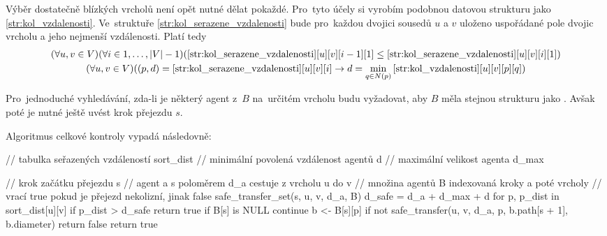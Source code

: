 Výběr dostatečně blízkých vrcholů není opět nutné dělat pokaždé.
Pro~tyto účely si vyrobím podobnou datovou strukturu jako \ref{str:kol_vzdalenosti}.
Ve~struktuře \ref{str:kol_serazene_vzdalenosti}
bude pro~každou dvojici sousedů $u$ a $v$ uloženo uspořádané pole dvojic vrcholu a jeho nejmenší vzdálenosti.
Platí tedy
\begin{gather*}
(\forall u, v \in V)(\forall i \in {1, \dots, |V| - 1})(\ref{str:kol_serazene_vzdalenosti}[u][v][i - 1][1] \leq
\ref{str:kol_serazene_vzdalenosti}[u][v][i][1])
	\\
	(\forall u, v \in V)((p, d) = \ref{str:kol_serazene_vzdalenosti}[u][v][i] \rightarrow
	d = \min_{q \in N(p)}\ref{str:kol_vzdalenosti}[u][v][p][q])
\end{gather*}

Pro~jednoduché vyhledávání, zda-li je některý agent z~$B$ na~určitém vrcholu budu vyžadovat,
aby $B$ měla stejnou strukturu jako .
Avšak poté je nutné ještě uvést krok přejezdu $s$.

Algoritmus celkové kontroly vypadá následovně:
\begin{code}[fontsize=\footnotesize]
// tabulka seřazených vzdáleností sort_dist
// minimální povolená vzdálenost agentů d
// maximální velikost agenta d_max

// krok začátku přejezdu s
// agent a s poloměrem d_a cestuje z vrcholu u do v
// množina agentů B indexovaná kroky a poté vrcholy
// vrací true pokud je přejezd nekolizní, jinak false
safe_transfer_set(s, u, v, d_a, B)
	d_safe = d_a + d_max + d
	for p, p_dist in sort_dist[u][v]
		if p_dist > d_safe
			return true
		if B[s] is NULL
			continue
		b <- B[s][p]
		if not safe_transfer(u, v, d_a, p, b.path[s + 1], b.diameter)
			return false
	return true
\end{code}
